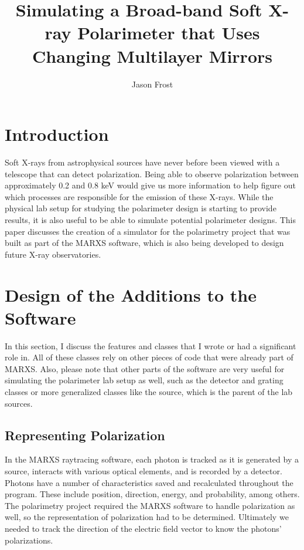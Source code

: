\documentclass[manuscript]{aastex}
\begin{document}
\title{Simulating a Broad-band Soft X-ray Polarimeter that Uses Changing Multilayer Mirrors}

\author{Jason Frost}




\section{Introduction}

Soft X-rays from astrophysical sources have never before been viewed with a telescope that can detect polarization. Being able to observe polarization between approximately 0.2 and 0.8 keV would give us more information to help figure out which processes are responsible for the emission of these X-rays. While the physical lab setup for studying the polarimeter design is starting to provide results, it is also useful to be able to simulate potential polarimeter designs. This paper discusses the creation of a simulator for the polarimetry project that was built as part of the MARXS software, which is also being developed to design future X-ray observatories.

\section{Design of the Additions to the Software}

In this section, I discuss the features and classes that I wrote or had a significant role in. All of these classes rely on other pieces of code that were already part of MARXS. Also, please note that other parts of the software are very useful for simulating the polarimeter lab setup as well, such as the detector and grating classes or more generalized classes like the source, which is the parent of the lab sources.

\subsection{Representing Polarization}

In the MARXS raytracing software, each photon is tracked as it is generated by a source, interacts with various optical elements, and is recorded by a detector. Photons have a number of characteristics saved and recalculated throughout the program. These include position, direction, energy, and probability, among others. The polarimetry project required the MARXS software to handle polarization as well, so the representation of polarization had to be determined. Ultimately we needed to track the direction of the electric field vector to know the photons' polarizations.
\end{document}
